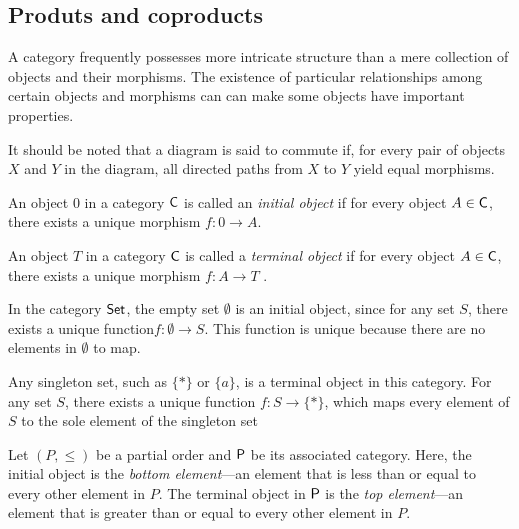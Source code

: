 



\subsection{Produts and coproducts}

 A category frequently possesses more intricate structure than a mere collection of objects and their morphisms. The existence of particular relationships among certain objects and morphisms can can make some objects have important properties.

It should be noted that a diagram is said to commute if, for every pair of objects $X$ and $Y$ in the diagram, all directed paths from 
$X$ to $Y$ yield equal morphisms.

\begin{definition}
  An object \( 0 \) in a category \( \mathsf{C} \) is called an \emph{initial object} if for every object \( A \in \mathsf{C}  \), there exists a unique morphism  $f: 0 \to A $.

\end{definition}

\begin{definition}
  An object \( T \) in a category \( \mathsf{C}  \) is called a \emph{terminal object} if for every object \( A \in \mathsf{C}  \), there exists a unique morphism $ f: A \to T $ .
\end{definition}

\begin{example}
In the category \( \mathsf{Set} \), the empty set \( \emptyset \) is an initial object, since for any set \( S \), there exists a unique function$f : \emptyset \to S.$
This function is unique because there are no elements in \( \emptyset \) to map.

Any singleton set, such as \( \{*\} \) or \( \{a\} \), is a terminal object in this category. For any set \( S \), there exists a unique function $f : S \to \{*\}$,
which maps every element of \( S \) to the sole element of the singleton set
\end{example}

\begin{example}
  Let $(P, \leq)$ be a partial order and $\mathsf{P}$ be its associated
 category.
  Here, the initial object is the \emph{bottom element}—an element that is less than or equal to every other element in $P$. The terminal object in $\mathsf{P}$ is the \emph{top element}—an element that is greater than or equal to every other element in $P$.
\end{example}




